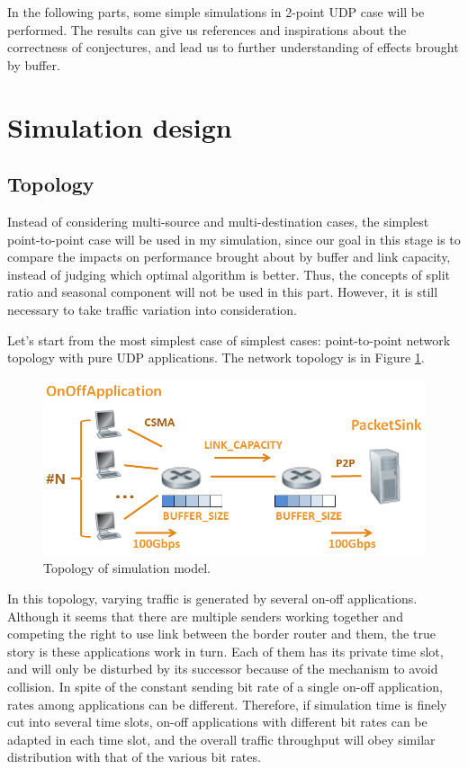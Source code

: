 \documentclass[a4paper]{article}
\begin{document}
In the following parts, some simple simulations in 2-point UDP case will be performed. The results can give us references and inspirations about the correctness of conjectures, and lead us to further understanding of effects brought by buffer.


\section{Simulation design}
\subsection{Topology}
Instead of considering multi-source and multi-destination cases, the simplest point-to-point case will be used in my simulation, since our goal in this stage is to compare the impacts on performance brought about by buffer and link capacity, instead of judging which optimal algorithm is better. Thus, the concepts of split ratio and seasonal component will not be used in this part. However, it is still necessary to take traffic variation into consideration.
	
Let's start from the most simplest case of simplest cases: point-to-point network topology with pure UDP applications. The network topology is in Figure \ref{fig:topo}.


\begin{figure}
\centering
\includegraphics[width=1\textwidth]{topo.png}
\caption{\label{fig:topo}Topology of simulation model.}
\end{figure}

In this topology, varying traffic is generated by several on-off applications. Although it seems that there are multiple senders working together and competing the right to use link between the border router and them, the true story is these applications work in turn. Each of them has its private time slot, and will only be disturbed by its successor because of the mechanism to avoid collision. In spite of the constant sending bit rate of a single on-off application, rates among applications can be different. Therefore, if simulation time is finely cut into several time slots, on-off applications with different bit rates can be adapted in each time slot, and the overall traffic throughput will obey similar distribution with that of the various bit rates.
\end{document}
